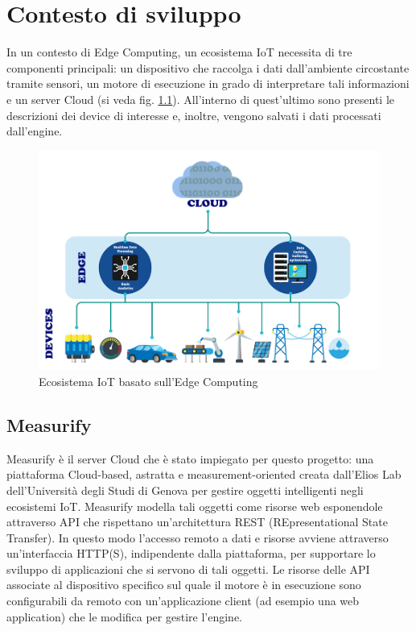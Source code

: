 \chapter{Contesto di sviluppo}
In un contesto di Edge Computing, un ecosistema IoT necessita di tre componenti principali: un dispositivo che raccolga i dati dall'ambiente circostante tramite sensori, un motore di esecuzione in grado di interpretare tali informazioni e un server Cloud (si veda fig. \ref{ecosistema}). All'interno di quest'ultimo sono presenti le descrizioni dei device di interesse e, inoltre, vengono salvati i dati processati dall'engine.

\begin{figure}[H]
	\centering
	\includegraphics[width=0.8\linewidth]{pics/edgestructure}
	\caption{Ecosistema IoT basato sull'Edge Computing}
	\label{ecosistema}
\end{figure}

\section{Measurify}
Measurify è il server Cloud che è stato impiegato per questo progetto: una piattaforma Cloud-based, astratta e measurement-oriented creata dall'Elios Lab dell'Università degli Studi di Genova per gestire oggetti intelligenti negli ecosistemi IoT. Measurify modella tali oggetti come risorse web esponendole attraverso API che rispettano un'architettura REST (REpresentational State Transfer). In questo modo l'accesso remoto a dati e risorse avviene attraverso un'interfaccia HTTP(S), indipendente dalla piattaforma, per supportare lo sviluppo di applicazioni che si servono di tali oggetti. Le risorse delle API associate al dispositivo specifico sul quale il motore è in esecuzione sono configurabili da remoto con un'applicazione client (ad esempio una web application) che le modifica per gestire l'engine.

